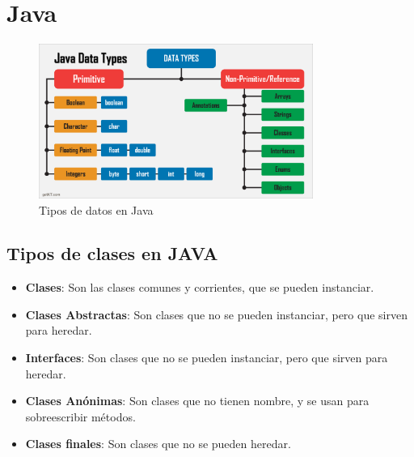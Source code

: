 \documentclass[../main.tex]{subfiles}
\begin{document}
\section{Java} 
    \begin{figure}[h]
        \centering
        \includegraphics[width=0.8\textwidth]{../images/tipos_datos.png}
        \caption{Tipos de datos en Java}
        \label{fig:java}
    \end{figure}

    \subsection{Tipos de clases en JAVA}
        \begin{itemize}
            \item \textbf{Clases}: Son las clases comunes y corrientes, que se pueden instanciar.
            \item \textbf{Clases Abstractas}: Son clases que no se pueden instanciar, pero que sirven para heredar.
            \item \textbf{Interfaces}: Son clases que no se pueden instanciar, pero que sirven para heredar.
            \item \textbf{Clases Anónimas}: Son clases que no tienen nombre, y se usan para sobreescribir métodos.
            \item \textbf{Clases finales}: Son clases que no se pueden heredar.
        \end{itemize}
\end{document}

